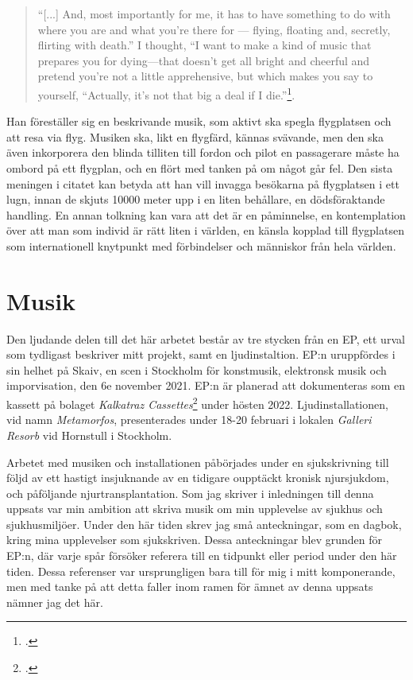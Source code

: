 \documentclass{article}
\begin{document}
\begin{quote}
``[...] And, most importantly for me, it has to have
something to do with where you are and what you're there for --- flying, floating and, secretly, flirting with
death.'' I thought, ``I want to make a kind of music that prepares you for dying—that doesn’t get all bright and
cheerful and pretend you’re not a little apprehensive, but which makes you say to yourself, ``Actually, it’s
not that big a deal if I die.''\footcite[152]{Eno}.
\end{quote}

Han föreställer sig en beskrivande musik, som aktivt ska spegla flygplatsen och att resa via flyg. Musiken
ska, likt en flygfärd, kännas svävande, men den ska även inkorporera den blinda tilliten till fordon och pilot
en passagerare måste ha ombord på ett flygplan, och en flört med tanken på om något går fel. Den sista meningen i
citatet kan betyda att han vill invagga besökarna på flygplatsen i ett lugn, innan de skjuts 10000 meter upp 
i en liten behållare, en dödsföraktande handling. En annan tolkning kan vara att det är en påminnelse, en
kontemplation över att man som individ är rätt liten i världen, en känsla kopplad till flygplatsen som 
internationell knytpunkt med förbindelser och människor från hela världen. 


\section{Musik}
Den ljudande delen till det här arbetet består av tre stycken från en EP, ett urval som tydligast beskriver
mitt projekt, samt en ljudinstaltion. EP:n uruppfördes i sin helhet på Skaiv, en scen i Stockholm för
konstmusik, elektronsk musik och imporvisation, den 6e november 2021. EP:n är planerad att dokumenteras som en
kassett på bolaget \emph{Kalkatraz Cassettes}\footcite{kalkatraz} under hösten 2022.
Ljudinstallationen, vid namn \emph{Metamorfos}, presenterades under 18-20 februari i lokalen \emph{Galleri
Resorb} vid Hornstull i Stockholm. 

Arbetet med musiken och installationen påbörjades under en sjukskrivning till följd av ett hastigt
insjuknande av en tidigare oupptäckt kronisk njursjukdom, och påföljande njurtransplantation. Som jag skriver
i inledningen till denna uppsats var min ambition att skriva musik om min upplevelse av sjukhus och
sjukhusmiljöer. Under den här tiden skrev jag små anteckningar, som en dagbok, kring mina upplevelser som
sjukskriven. Dessa anteckningar blev grunden för EP:n, där varje spår försöker referera till en tidpunkt eller
period under den här tiden. Dessa referenser var ursprungligen bara till för mig i mitt komponerande, men med
tanke på att detta faller inom ramen för ämnet av denna uppsats nämner jag det här. 
\end{document}
